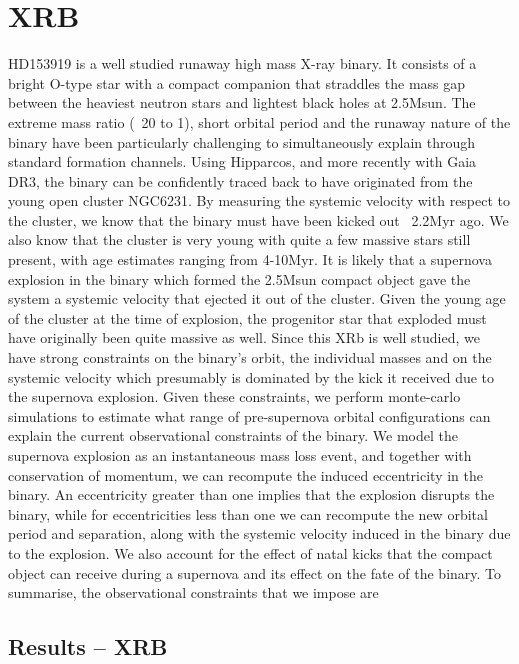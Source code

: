 \documentclass[linenumbers,trackchanges,twocolumn]{aastex701}
\begin{document}
\section{XRB}

HD153919 is a well studied runaway high mass X-ray binary. It consists of a bright O-type star with a compact companion that straddles the mass gap between the heaviest neutron stars and lightest black holes at 2.5Msun. The extreme mass ratio (~20 to 1), short orbital period and the runaway nature of the binary have been particularly challenging to simultaneously explain through standard formation channels. Using Hipparcos, and more recently with Gaia DR3, the binary can be confidently traced back to have originated from the young open cluster NGC6231. By measuring the systemic velocity with respect to the cluster, we know that the binary must have been kicked out ~2.2Myr ago. We also know that the cluster is very young with quite a few massive stars still present, with age estimates ranging from 4-10Myr. It is likely that a supernova explosion in the binary which formed the 2.5Msun compact object gave the system a systemic velocity that ejected it out of the cluster. Given the young age of the cluster at the time of explosion, the progenitor star that exploded must have originally been quite massive as well. Since this XRb is well studied, we have strong constraints on the binary's orbit, the individual masses and on the systemic velocity which presumably is dominated by the kick it received due to the supernova explosion. Given these constraints, we perform monte-carlo simulations to estimate what range of pre-supernova orbital configurations can explain the current observational constraints of the binary. We model the supernova explosion as an instantaneous mass loss event, and together with conservation of momentum, we can recompute the induced eccentricity in the binary. An eccentricity greater than one implies that the explosion disrupts the binary, while for eccentricities less than one we can recompute the new orbital period and separation, along with the systemic velocity induced in the binary due to the explosion. We also account for the effect of natal kicks that the compact object can receive during a supernova and its effect on the fate of the binary. To summarise, the observational constraints that we impose are

\subsection{Results -- XRB}
\end{document}
